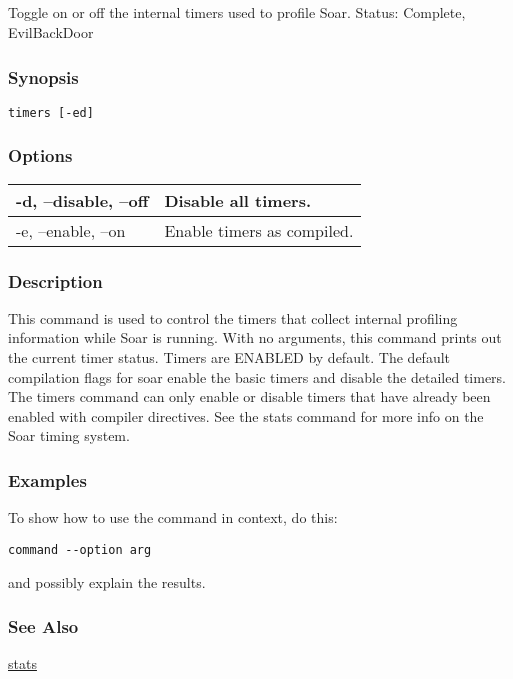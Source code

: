 \subsection{}
\label{timers}
Toggle on or off the internal timers used to profile Soar. 
 Status: Complete, EvilBackDoor
\subsubsection*{Synopsis}
\begin{verbatim}
timers [-ed]
\end{verbatim}
\subsubsection*{Options}
\begin{tabular}{|l|l|}
\hline 
 -d, --disable, --off  & Disable all timers.  \\
 \hline 
 -e, --enable, --on  & Enable timers as compiled.  \\
 \hline 
\end{tabular}
\subsubsection*{Description}
 This command is used to control the timers that collect internal profiling information while Soar is running. With no arguments, this command prints out the current timer status. Timers are ENABLED by default. The default compilation flags for soar enable the basic timers and disable the detailed timers. The timers command can only enable or disable timers that have already been enabled with compiler directives. See the stats command for more info on the Soar timing system. 
\subsubsection*{Examples}
 To show how to use the command in context, do this: \begin{verbatim}
command --option arg
\end{verbatim}
 and possibly explain the results. 
\subsubsection*{See Also}
\hyperref[stats]{stats} 